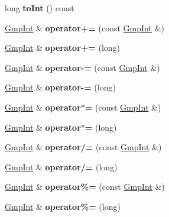 \begin{DoxyCompactItemize}
long {\bfseries to\+Int} () const
\item 
\mbox{\label{class_gmp_int_a0720ac71ce8f9042cd50b5ad5d397222}} 
\hyperlink{class_gmp_int}{Gmp\+Int} \& {\bfseries operator+=} (const \hyperlink{class_gmp_int}{Gmp\+Int} \&)
\item 
\mbox{\label{class_gmp_int_af85c60d76588f7ade3b3356cc5862921}} 
\hyperlink{class_gmp_int}{Gmp\+Int} \& {\bfseries operator+=} (long)
\item 
\mbox{\label{class_gmp_int_a9c3efd3343771d4142e58e005467b7e1}} 
\hyperlink{class_gmp_int}{Gmp\+Int} \& {\bfseries operator-\/=} (const \hyperlink{class_gmp_int}{Gmp\+Int} \&)
\item 
\mbox{\label{class_gmp_int_a2e994af7dec91304557a27b21b36e3df}} 
\hyperlink{class_gmp_int}{Gmp\+Int} \& {\bfseries operator-\/=} (long)
\item 
\mbox{\label{class_gmp_int_aa3ed85b2f6e11c505fa2a00532fd96fd}} 
\hyperlink{class_gmp_int}{Gmp\+Int} \& {\bfseries operator$\ast$=} (const \hyperlink{class_gmp_int}{Gmp\+Int} \&)
\item 
\mbox{\label{class_gmp_int_a3fc5d0ea3a6ead236fabc7e7d716c692}} 
\hyperlink{class_gmp_int}{Gmp\+Int} \& {\bfseries operator$\ast$=} (long)
\item 
\mbox{\label{class_gmp_int_a17c7bf2f9538ca79edc78fedd635ed68}} 
\hyperlink{class_gmp_int}{Gmp\+Int} \& {\bfseries operator/=} (const \hyperlink{class_gmp_int}{Gmp\+Int} \&)
\item 
\mbox{\label{class_gmp_int_a9f1d089ade1d26f0bd050dac41a8223b}} 
\hyperlink{class_gmp_int}{Gmp\+Int} \& {\bfseries operator/=} (long)
\item 
\mbox{\label{class_gmp_int_a1cd7ff6ff736142c3dddef5998a805ad}} 
\hyperlink{class_gmp_int}{Gmp\+Int} \& {\bfseries operator\%=} (const \hyperlink{class_gmp_int}{Gmp\+Int} \&)
\item 
\mbox{\label{class_gmp_int_a471eb9ea0688a40f13f0616f2d7cb3ca}} 
\hyperlink{class_gmp_int}{Gmp\+Int} \& {\bfseries operator\%=} (long)

\end{DoxyCompactItemize}

